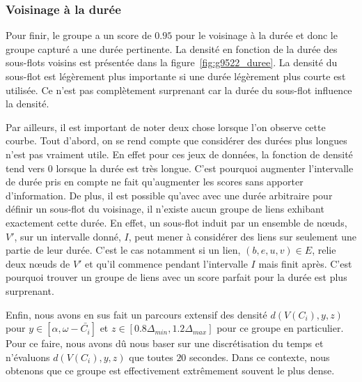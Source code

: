 \subsubsection*{Voisinage à la durée}
Pour finir, le groupe a un score de $0.95$ pour le voisinage à la durée et donc le groupe capturé a une durée  pertinente.
La densité en fonction de la durée des sous-flots voisins est présentée dans la figure~\ref{fig:g9522_duree}.
La densité du sous-flot est légèrement plus importante si une durée légèrement plus courte est utilisée.
Ce n'est pas complètement surprenant car la durée du sous-flot influence la densité.

Par ailleurs, il est important de noter deux chose lorsque l'on observe cette courbe.
Tout d'abord, on se rend compte que considérer des durées plus longues n'est pas vraiment utile.
En effet pour ces jeux de données, la fonction de densité tend vers $0$ lorsque la durée est très longue.
C'est pourquoi augmenter l'intervalle de durée pris en compte ne fait qu'augmenter les scores sans apporter d'information.
De plus, il est possible qu'avec avec une durée arbitraire pour définir un sous-flot du voisinage, il n'existe aucun groupe de liens exhibant exactement cette durée.
En effet, un sous-flot induit par un ensemble de n\oe{}uds, $V'$, sur un intervalle donné, $I$, peut mener à considérer des liens sur seulement une partie de leur durée.
C'est le cas notamment si un lien, $(b,e,u,v) \in E$, relie deux n\oe{}uds de $V'$ et qu'il commence pendant l'intervalle $I$ mais finit après.
C'est pourquoi trouver un groupe de liens avec un score parfait pour la durée est plus surprenant.

\bigskip

Enfin, nous avons en sus fait un parcours extensif des densité $d(V(C_i),y,z)$ pour $y \in [\alpha, \omega - \bar{C_i}]$ et $z \in [0.8\Delta_{min}, 1.2\Delta_{max}]$ pour ce groupe en particulier.
Pour ce faire, nous avons dû nous baser sur une discrétisation du temps et n'évaluons $d(V(C_i),y,z)$ que toutes $20$ secondes.
Dans ce contexte, nous obtenons que ce groupe est effectivement extrêmement souvent le plus dense.


